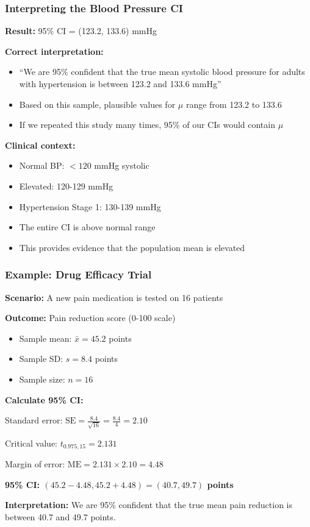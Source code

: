 \documentclass{beamer}
\begin{document}
\begin{frame}
\frametitle{Interpreting the Blood Pressure CI}
\textbf{Result:} 95\% CI = (123.2, 133.6) mmHg

\vspace{0.5cm}
\textbf{Correct interpretation:}
\begin{itemize}
\item ``We are 95\% confident that the true mean systolic blood pressure for adults with hypertension is between 123.2 and 133.6 mmHg''
\item Based on this sample, plausible values for $\mu$ range from 123.2 to 133.6
\item If we repeated this study many times, 95\% of our CIs would contain $\mu$
\end{itemize}

\vspace{0.5cm}
\textbf{Clinical context:}
\begin{itemize}
\item Normal BP: $< 120$ mmHg systolic
\item Elevated: 120-129 mmHg
\item Hypertension Stage 1: 130-139 mmHg
\item The entire CI is above normal range
\item This provides evidence that the population mean is elevated
\end{itemize}
\end{frame}

\begin{frame}
\frametitle{Example: Drug Efficacy Trial}
\textbf{Scenario:} A new pain medication is tested on 16 patients

\vspace{0.3cm}
\textbf{Outcome:} Pain reduction score (0-100 scale)
\begin{itemize}
\item Sample mean: $\bar{x} = 45.2$ points
\item Sample SD: $s = 8.4$ points
\item Sample size: $n = 16$
\end{itemize}

\vspace{0.3cm}
\textbf{Calculate 95\% CI:}

Standard error: $\text{SE} = \frac{8.4}{\sqrt{16}} = \frac{8.4}{4} = 2.10$

Critical value: $t_{0.975, 15} = 2.131$

Margin of error: $\text{ME} = 2.131 \times 2.10 = 4.48$

\textbf{95\% CI: $(45.2 - 4.48, 45.2 + 4.48) = (40.7, 49.7)$ points}

\vspace{0.3cm}
\textbf{Interpretation:} We are 95\% confident that the true mean pain reduction is between 40.7 and 49.7 points.
\end{frame}
\end{document}

